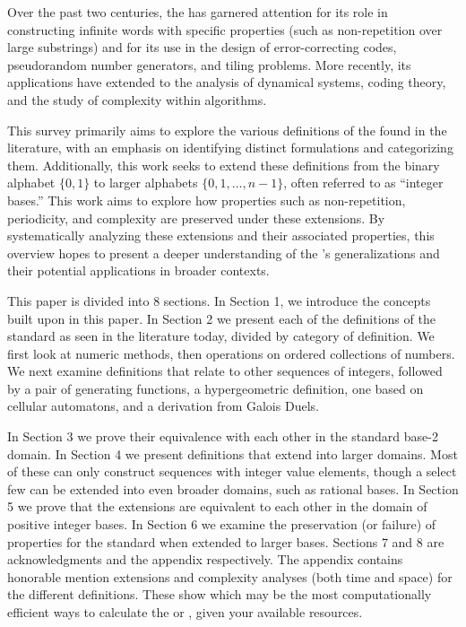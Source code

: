 \documentclass[conference]{IEEEtran}
\begin{document}
Over the past two centuries, the \TMS has garnered attention for its role in constructing infinite words with specific properties (such as non-repetition over large substrings) and for its use in the design of error-correcting codes, pseudorandom number generators, and tiling problems. More recently, its applications have extended to the analysis of dynamical systems, coding theory, and the study of complexity within algorithms.

This survey primarily aims to explore the various definitions of the \TMS found in the literature, with an emphasis on identifying distinct formulations and categorizing them. Additionally, this work seeks to extend these definitions from the binary alphabet $\{0,1\}$ to larger alphabets $\{0,1,\dots,n\!\!-\!\!1\}$, often referred to as ``integer bases.'' This work aims to explore how properties such as non-repetition, periodicity, and complexity are preserved under these extensions. By systematically analyzing these extensions and their associated properties, this overview hopes to present a deeper understanding of the \TMS's generalizations and their potential applications in broader contexts.

This paper is divided into 8 sections. In Section 1, we introduce the concepts built upon in this paper. In Section 2 we present each of the \TotalOriginals definitions of the standard \TMS as seen in the literature today, divided by category of definition. We first look at numeric methods, then operations on ordered collections of numbers. We next examine definitions that relate to other sequences of integers, followed by a pair of generating functions, a hypergeometric definition, one based on cellular automatons, and a derivation from Galois Duels.

In Section 3 we prove their equivalence with each other in the standard base-2 domain. In Section 4 we present \TotalExtensions definitions that extend into larger domains. Most of these can only construct sequences with integer value elements, though a select few can be extended into even broader domains, such as rational bases. In Section 5 we prove that the extensions are equivalent to each other in the domain of positive integer bases. In Section 6 we examine the preservation (or failure) of properties for the standard \TMS when extended to larger bases. Sections 7 and 8 are acknowledgments and the appendix respectively. The appendix contains honorable mention extensions and complexity analyses (both time and space) for the different definitions. These show which may be the most computationally efficient ways to calculate the \TMS or \ETMS, given your available resources.
\end{document}
